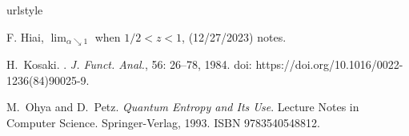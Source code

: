 \documentclass[12pt]{article}
\theoremstyle{definition}
\theoremstyle{remark}
\begin{document}
%
%


\begin{thebibliography}{2}
\providecommand{\natexlab}[1]{#1}
\providecommand{\url}[1]{\texttt{#1}}
\expandafter\ifx\csname urlstyle\endcsname\relax
  \providecommand{\doi}[1]{doi: #1}\else
  \providecommand{\doi}{doi: \begingroup \urlstyle{rm}\Url}\fi


 F. Hiai, $\lim_{\alpha\searrow 1}$ when $1/2<z<1$, (12/27/2023) notes.

H.~Kosaki.
.
\newblock \emph{{J. Funct. Anal.}}, {56}: {26--78}, {1984}.
\newblock \doi{https://doi.org/10.1016/0022-1236(84)90025-9}.

M.~Ohya and D.~Petz.
\newblock \emph{Quantum Entropy and Its Use}.
\newblock Lecture Notes in Computer Science. Springer-Verlag, 1993.
\newblock ISBN 9783540548812.


\end{thebibliography}
\end{document}

